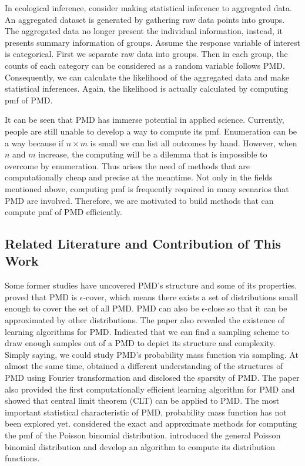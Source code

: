 \documentclass[12pt]{article}
\newcommand{\PMD}{\textrm{PMD}}
\begin{document}
In ecological inference, consider making statistical inference to aggregated data. An aggregated dataset is generated by gathering raw data points into groups. The aggregated data no longer present the individual information, instead, it presents  summary information of groups. Assume the response variable of interest is categorical. First we separate raw data into groups. Then in each group, the counts of each category can be considered as a random variable follows $\PMD$. Consequently, we can calculate the likelihood of the aggregated data and make statistical inferences. Again, the likelihood is actually calculated by computing pmf of $\PMD$.

It can be seen that $\PMD$ has immerse potential in applied science. Currently, people are still unable to develop a way to compute its pmf. Enumeration can be a way because if $n \times m$ is small we can list all outcomes by hand. However, when $n$ and $m$ increase, the computing will be a dilemma that is impossible to overcome by enumeration. Thus arises the need of methods that are computationally cheap and precise at the meantime. Not only in the fields mentioned above, computing pmf is frequently required in many scenarios that $\PMD$ are involved. Therefore, we are motivated to build methods that can compute pmf of $\PMD$ efficiently.



\subsection{Related Literature and Contribution of This Work}


Some former studies have uncovered $\PMD$'s structure and some of its properties.  proved that $\PMD$ is $\epsilon$-cover, which means there exists a set of distributions small enough to cover the set of all $\PMD$. $\PMD$ can also be $\epsilon$-close so that it can be approximated by other distributions. The paper also revealed the existence of learning algorithms for $\PMD$. Indicated that we can find a sampling scheme to draw enough samples out of a $\PMD$ to depict its structure and complexity. Simply saying, we could study $\PMD$'s probability mass function via sampling. At almost the same time,  obtained a different understanding of the structures of $\PMD$ using Fourier transformation and disclosed the sparsity of $\PMD$. The paper also provided the first computationally efficient learning algorithm for $\PMD$ and showed that central limit theorem (CLT) can be applied to $\PMD$. The most important statistical characteristic of $\PMD$, probability mass function has not been explored yet.  considered the exact and approximate methods for computing the pmf of the Poisson binomial distribution.  introduced the general Poisson binomial distribution and develop an algorithm to compute its distribution functions.
\end{document}
